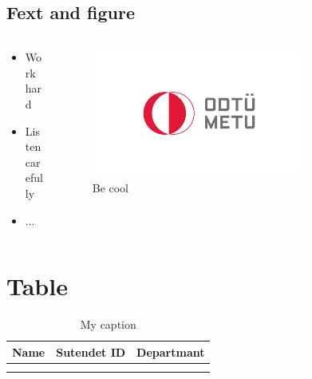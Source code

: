 \documentclass{beamer}
\begin{document}
\subsection{Fext and figure}
\begin{frame}
\begin{columns}
    \begin{column}{0.40\textwidth}
        \begin{itemize}
            \item Work hard
            \item Listen carefully
            \item ...
        \end{itemize}
    \end{column}
    \begin{column}{0.6\textwidth}
		\begin{figure}
        \includegraphics[width=0.75\textwidth]{logo.jpg}
				\caption{Be cool}
		\end{figure}
    \end{column}
\end{columns}
\end{frame}
\section{Table}
\begin{frame}
\begin{table}[]
\centering
\caption{My caption}
\label{my-label}
\begin{tabular}{|l|l|l|}
\hline
Name & Sutendet ID & Departmant \\ \hline
     &             &            \\ \hline
     &             &            \\ \hline
\end{tabular}
\end{table}
\end{frame}
\end{document}
